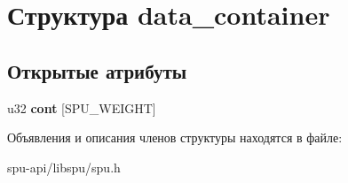 \hypertarget{structdata__container}{}\section{Структура data\+\_\+container}
\label{structdata__container}
\subsection*{Открытые атрибуты}
\begin{DoxyCompactItemize}
\item 
\mbox{\label{structdata__container_aca87ea9dd5d4263504c7743e770dcce3}} 
u32 {\bfseries cont} \mbox{[}S\+P\+U\+\_\+\+W\+E\+I\+G\+HT\mbox{]}
\end{DoxyCompactItemize}


Объявления и описания членов структуры находятся в файле\+:\begin{DoxyCompactItemize}
\item 
spu-\/api/libspu/spu.\+h\end{DoxyCompactItemize}
